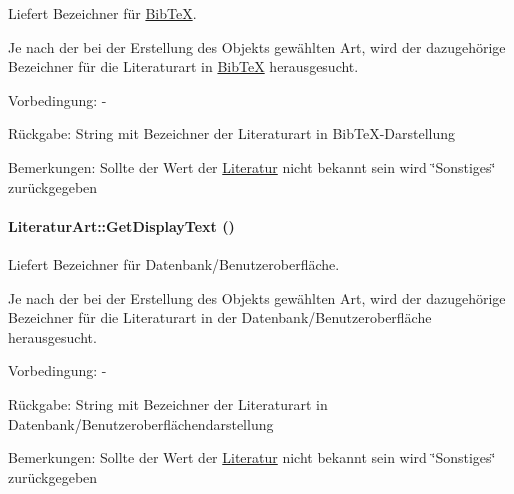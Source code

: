 Liefert Bezeichner für \hyperlink{classBibTeX}{Bib\-Te\-X}. 

Je nach der bei der Erstellung des Objekts gewählten Art, wird der dazugehörige Bezeichner für die Literaturart in \hyperlink{classBibTeX}{Bib\-Te\-X} herausgesucht. \begin{Desc}
\item[Vorbedingung:]- \end{Desc}
\begin{Desc}
\item[R\"{u}ckgabe:]String mit Bezeichner der Literaturart in Bib\-Te\-X-Darstellung \end{Desc}
\begin{Desc}
\item[Bemerkungen:]Sollte der Wert der \hyperlink{classLiteratur}{Literatur} nicht bekannt sein wird \char`\"{}Sonstiges\char`\"{} zurückgegeben \end{Desc}
\hypertarget{classLiteraturArt_43f747a6c5d840a22ddcd7e46d27cba0}{
\paragraph[GetDisplayText]{\setlength{\rightskip}{0pt plus 5cm}Literatur\-Art::Get\-Display\-Text ()}\hfill}
\label{classLiteraturArt_43f747a6c5d840a22ddcd7e46d27cba0}


Liefert Bezeichner für Datenbank/Benutzeroberfläche. 

Je nach der bei der Erstellung des Objekts gewählten Art, wird der dazugehörige Bezeichner für die Literaturart in der Datenbank/Benutzeroberfläche herausgesucht. \begin{Desc}
\item[Vorbedingung:]- \end{Desc}
\begin{Desc}
\item[R\"{u}ckgabe:]String mit Bezeichner der Literaturart in Datenbank/Benutzeroberflächendarstellung \end{Desc}
\begin{Desc}
\item[Bemerkungen:]Sollte der Wert der \hyperlink{classLiteratur}{Literatur} nicht bekannt sein wird \char`\"{}Sonstiges\char`\"{} zurückgegeben \end{Desc}
